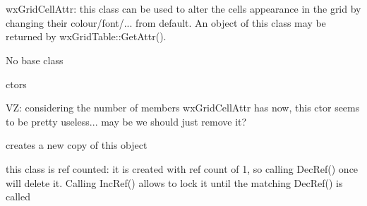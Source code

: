 %
%


\section{}\label{wxgridcellattr}



wxGridCellAttr: this class can be used to alter the cells appearance in
the grid by changing their colour/font/... from default. An object of this
class may be returned by wxGridTable::GetAttr().



No base class




\label{wxgridcellattrwxgridcellattr}


ctors


\label{wxgridcellattrwxgridcellattr}


VZ: considering the number of members wxGridCellAttr has now, this ctor
seems to be pretty useless... may be we should just remove it?


\label{wxgridcellattrclone}


creates a new copy of this object


\label{wxgridcellattrincref}


this class is ref counted: it is created with ref count of 1, so
calling DecRef() once will delete it. Calling IncRef() allows to lock
it until the matching DecRef() is called


\label{wxgridcellattrdecref}



\label{wxgridcellattrsettextcolour}

